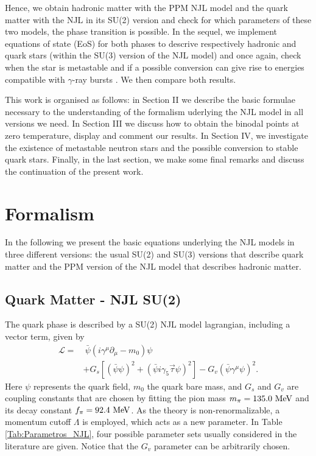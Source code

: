 \documentclass[prc, reprint, amsmath, floatfix,10pt]{revtex4-1}
\begin{document}
Hence, we obtain hadronic matter with the PPM NJL model and the quark
matter with the NJL in its SU(2) version and check for which
parameters of these two models, the phase transition is possible. In
the sequel, we implement equations of state (EoS) for both phases to
descrive respectively hadronic and quark stars (within the SU(3)
version of the NJL model) and once again, check
when the star is metastable and if a possible conversion can give rise
to energies compatible with $\gamma$-ray bursts 
\cite{2002NuPhS.113..268B, 2003ApJ...586.1250B, 2004ApJ...614..314B,
  burst}. We then compare both results.


This work is organised as follows: in Section II we describe the basic
formulae necessary to the understanding of the formalism uderlying the
NJL model in all versions we need. In Section III we discuss how to
obtain the binodal points at zero temperature, display and comment our
results. In Section IV, we investigate the existence of metastable
neutron stars and the possible conversion to stable quark
stars. Finally, in the last section, we make some final remarks and
discuss the continuation of the present work.


\section{Formalism} 

In the following we present the basic equations underlying the NJL
models in three different versions: the usual SU(2) and SU(3) versions
that describe quark matter and the PPM version of the NJL model that
describes hadronic matter. 

\subsection{Quark Matter - NJL SU(2)}\label{NJLSU2}


The quark phase is described by a SU(2) NJL model lagrangian, including a vector term, given by \cite{Buballa2005}
\begin{equation}\label{Eq:LagNJL-SU2-Bub}
\begin{split}
	\mathscr{L} =&~ \bar{\psi}(i\gamma^\mu\partial_\mu - m_0)\psi \\
	&+ G_s[(\bar{\psi}\psi)^2 + (\bar{\psi}i\gamma_5\vec{\tau}\psi)^2] - G_v(\bar{\psi}\gamma^\mu \psi)^2.
\end{split}
\end{equation}
%
Here $\psi$ represents the quark field, $m_0$ the quark bare mass, and
$G_s$ and $G_v$ are coupling constants that are chosen by fitting the
pion mass $m_\pi = 135.0~\rm{MeV}$ and its decay constant $f_\pi =
92.4~\rm{MeV}$. As the theory is non-renormalizable, a momentum cutoff
$\Lambda$ is employed, which acts as a new parameter.
In Table \ref{Tab:Parametros_NJL}, four possible parameter sets usually
considered in the literature are given. Notice that the $G_v$
parameter can be arbitrarily chosen.
\end{document}
